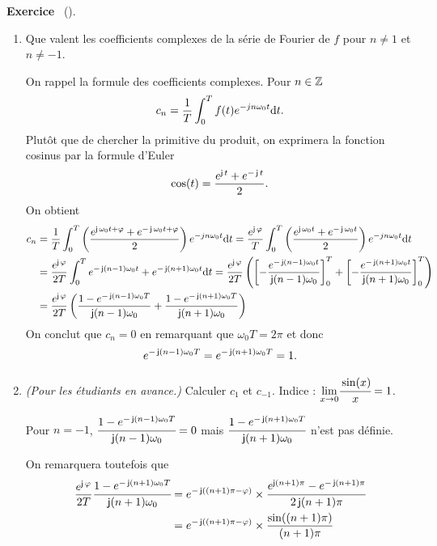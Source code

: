 \documentclass[a4paper,11pt]{article}
\theoremstyle{definition}
\newcounter{exercice}   %
\newenvironment{exercice}[1][]{%
  \refstepcounter{exercice}%
  \par\noindent\textbf{Exercice \theexercice}\if\relax\detokenize{#1}\relax\else\ (#1)\fi.\par\noindent\ignorespaces
}{\par}
\begin{document}
\begin{exercice}
\begin{enumerate}[\bfseries 1.]
            \item Que valent les coefficients complexes de la série de Fourier de $f$ pour $n \neq 1$ et $n\neq -1$.
            \begin{solution}
                On rappel la formule des coefficients complexes. Pour $n\in{\mathbb{Z}}$
                $$
                    c_n = \frac{1}{T} \int_0^T f(t) e^{-jn\omega_0t}{\rm d} t.
                $$
                Plutôt que de chercher la primitive du produit, on exprimera la fonction cosinus par la formule d'Euler
                $$
                    \cos(t) = \frac{e^{\operatorname{\mathsf{j}} t} + e^{-\operatorname{\mathsf{j}} t}}{2}.
                $$
                On obtient
                $$
                \begin{aligned}
                    c_n &= \frac{1}{T}\int_0^T \left( \frac{e^{\operatorname{\mathsf{j}} \omega_0 t + \varphi} + e^{-\operatorname{\mathsf{j}} \omega_0 t + \varphi}}{2} \right) e^{-jn\omega_0t}{\rm d} t = \frac{e^{\operatorname{\mathsf{j}}\varphi}}{T}\int_0^T \left( \frac{e^{\operatorname{\mathsf{j}} \omega_0 t} + e^{-\operatorname{\mathsf{j}} \omega_0 t}}{2} \right) e^{-jn\omega_0t}{\rm d} t \\
                    & = \frac{e^{\operatorname{\mathsf{j}}\varphi}}{2T}\int_0^T e^{-\operatorname{\mathsf{j}} (n-1)\omega_0 t} + e^{-\operatorname{\mathsf{j}} (n+1)\omega_0 t} {\rm d} t = \frac{e^{\operatorname{\mathsf{j}}\varphi}}{2T} \left(\left[- \frac{e^{-\operatorname{\mathsf{j}} (n-1)\omega_0 t}}{\operatorname{\mathsf{j}} (n-1)\omega_0}\right]_0^T + \left[- \frac{e^{-\operatorname{\mathsf{j}} (n+1)\omega_0 t}}{\operatorname{\mathsf{j}} (n+1)\omega_0}\right]_0^T\right) \\
                    &= \frac{e^{\operatorname{\mathsf{j}}\varphi}}{2T}\left(\frac{1 - e^{-\operatorname{\mathsf{j}} (n-1)\omega_0 T}}{\operatorname{\mathsf{j}} (n-1)\omega_0} + \frac{1 - e^{-\operatorname{\mathsf{j}} (n+1)\omega_0 T}}{\operatorname{\mathsf{j}} (n+1)\omega_0}\right)
                \end{aligned}
                $$
                On conclut que $c_n = 0$ en remarquant que $\omega_0 T = 2\pi$ et donc  $$e^{-\operatorname{\mathsf{j}} (n-1)\omega_0 T}= e^{-\operatorname{\mathsf{j}} (n+1)\omega_0 T} =1.$$

            \end{solution}
            \item \textit{(Pour les étudiants en avance.)} Calculer $c_1$ et $c_{-1}$. Indice : $\underset{x\to 0}{\lim} \cfrac{\sin(x)}{x} = 1$.
            \begin{solution}
                Pour $n=-1$,
                $\cfrac{1 - e^{-\operatorname{\mathsf{j}} (n-1)\omega_0 T}}{\operatorname{\mathsf{j}} (n-1)\omega_0} = 0$
                mais $\cfrac{1 - e^{-\operatorname{\mathsf{j}} (n+1)\omega_0 T}}{\operatorname{\mathsf{j}} (n+1)\omega_0}$ n'est pas définie.

                On remarquera toutefois que
                $$
                \begin{aligned}
                    \frac{e^{\operatorname{\mathsf{j}}\varphi}}{2T}\cfrac{1 - e^{-\operatorname{\mathsf{j}} (n+1)\omega_0 T}}{\operatorname{\mathsf{j}} (n+1)\omega_0} &= e^{-\operatorname{\mathsf{j}} ((n+1)\pi - \varphi)}\times \cfrac{e^{\operatorname{\mathsf{j}} (n+1)\pi} - e^{-\operatorname{\mathsf{j}} (n+1)\pi}}{2\operatorname{\mathsf{j}} (n+1)\pi} \\
                    & = e^{-\operatorname{\mathsf{j}} ((n+1)\pi - \varphi)}\times \frac{\sin((n+1)\pi)}{(n+1)\pi}
                \end{aligned}
                    $$


\end{solution}
\end{enumerate}
\end{exercice}
\end{document}
